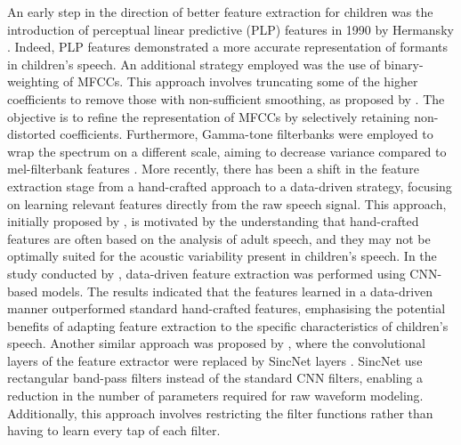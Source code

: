 An early step in the direction of better feature extraction for children was the introduction of perceptual linear predictive (PLP) features in 1990 by Hermansky \cite{Hermansky1990PerceptualLP}. Indeed, PLP features demonstrated  a more accurate representation of formants in children's speech.  An additional strategy employed was the use of binary-weighting of MFCCs. This approach involves truncating some of the higher coefficients to remove those with non-sufficient smoothing, as proposed by \cite{ghai2009exploring}. The objective is to refine the representation of MFCCs by selectively retaining non-distorted coefficients. Furthermore, Gamma-tone filterbanks were employed to wrap the spectrum on a different scale, aiming to decrease variance compared to mel-filterbank features \cite{shahnawazuddin2023gammatone}.
More recently, there has been a shift in the feature extraction stage from a hand-crafted approach to a data-driven strategy, focusing on learning relevant features directly from the raw speech signal. This approach, initially proposed by \cite{feat_ext_from_raw}, is motivated by the understanding that hand-crafted features are often based on the analysis of adult speech, and they may not be optimally suited for the acoustic variability present in children's speech. In the study conducted by \cite{feat_ext_from_raw}, data-driven feature extraction was performed using CNN-based models. The results indicated that the features learned in a data-driven manner outperformed standard hand-crafted features, emphasising the potential benefits of adapting feature extraction to the specific characteristics of children's speech. Another similar approach was proposed by \cite{sincnet_adapt}, where the convolutional layers of the feature extractor were replaced by SincNet layers \cite{Sincnet}. SincNet use rectangular band-pass filters instead of the standard CNN filters, enabling a reduction in the number of parameters required for raw waveform modeling. Additionally, this approach involves restricting the filter functions rather than having to learn every tap of each filter. 
